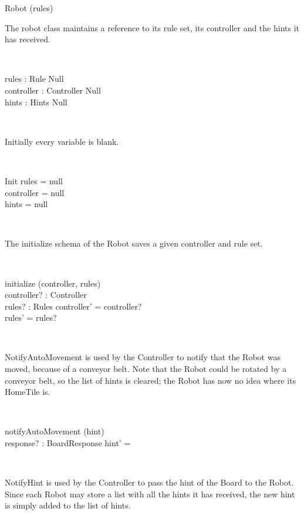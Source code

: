 \documentclass[12pt]{article}
\begin{document}
\begin{class}{Robot}
\upharpoonright (rules) \\
\begin{zpar}
The robot class maintains a reference to its rule set, its controller and the hints it has received.
\end{zpar} \\
\begin{state}
rules : Rule \cup Null \\
controller : Controller \cup Null \\
hints : \power Hints \cup Null
\end{state}\\
\begin{zpar}
Initially every variable is blank.
\end{zpar} \\
\begin{schema}{Init}
rules = null \\
controller = null \\
hints = null
\end{schema} \\
\begin{zpar}
The initialize schema of the Robot saves a given controller and rule set.
\end{zpar} \\
\begin{schema}{initialize}
\Delta (controller, rules) \\
controller? : Controller \\
rules? : Rules
\where
controller' = controller? \\
rules' = rules?
\end{schema} \\
\begin{zpar}
NotifyAutoMovement is used by the Controller to notify that the Robot was moved, because of a conveyor belt. Note that the Robot could be rotated by a conveyor belt, so the list of hints is cleared; the Robot has now no idea where its HomeTile is.
\end{zpar} \\
\begin{schema}{notifyAutoMovement}
\Delta (hint) \\
response? : BoardResponse
\where
hint' = \emptyset
\end{schema}\\
\begin{zpar}
NotifyHint is used by the Controller to pass the hint of the Board to the Robot. Since each Robot may store a list with all the hints it has received, the new hint is simply added to the list of hints.

\end{zpar}
\end{class}
\end{document}

